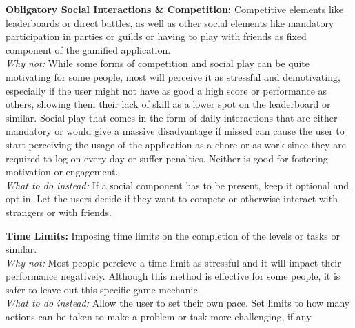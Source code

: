 \textbf{Obligatory Social Interactions \& Competition:}
Competitive elements like leaderboards or direct battles, as well as other social elements like mandatory participation in parties or guilds or having to play with friends as fixed component of the gamified application. \\ \indent
\textit{Why not:} While some forms of competition and social play can be quite motivating for some people, most will perceive it as stressful and demotivating, especially if the user might not have as good a high score or performance as others, showing them their lack of skill as a lower spot on the leaderboard or similar. Social play that comes in the form of daily interactions that are either mandatory or would give a massive disadvantage if missed can cause the user to start perceiving the usage of the application as a chore or as work since they are required to log on every day or suffer penalties. Neither is good for fostering motivation or engagement. \\ \indent
\textit{What to do instead:} If a social component has to be present, keep it optional and opt-in. Let the users decide if they want to compete or otherwise interact with strangers or with friends.

\textbf{Time Limits:}
Imposing time limits on the completion of the levels or tasks or similar. \\ \indent
\textit{Why not:} Most people percieve a time limit as stressful and it will impact their performance negatively. Although this method is effective for some people, it is safer to leave out this specific game mechanic. \\ \indent
\textit{What to do instead:} Allow the user to set their own pace. Set limits to how many actions can be taken to make a problem or task more challenging, if any.


